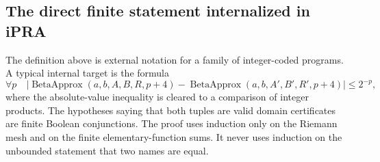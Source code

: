 \subsection{The direct finite statement internalized in iPRA}

The definition above is external notation for a family of integer-coded programs.  A typical internal target is the formula
\[
 \forall p\quad
 \left|\operatorname{BetaApprox}(a,b,A,B,R,p+4)
      -\operatorname{BetaApprox}(a,b,A',B',R',p+4)
 \right|\le2^{-p},
\]
where the absolute-value inequality is cleared to a comparison of integer products.  The hypotheses saying that both tuples are valid domain certificates are finite Boolean conjunctions.  The proof uses induction only on the Riemann mesh and on the finite elementary-function sums.  It never uses induction on the unbounded statement that two names are equal.

